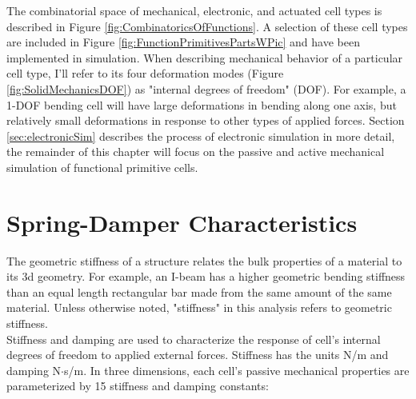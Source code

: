 { The combinatorial space of mechanical, electronic, and actuated cell types is described in Figure \ref{fig:CombinatoricsOfFunctions}.  A selection of these cell types are included in Figure \ref{fig:FunctionPrimitivesPartsWPic} and have been implemented in simulation.  When describing mechanical behavior of a particular cell type, I'll refer to its four deformation modes (Figure \ref{fig:SolidMechanicsDOF}) as "internal degrees of freedom" (DOF).  For example, a 1-DOF bending cell will have large deformations in bending along one axis, but relatively small deformations in response to other types of applied forces.  Section \ref{sec:electronicSim} describes the process of electronic simulation in more detail, the remainder of this chapter will focus on the passive and active mechanical simulation of functional primitive cells.

\section{Spring-Damper Characteristics}

The geometric stiffness of a structure relates the bulk properties of a material to its 3d geometry.  For example, an I-beam has a higher geometric bending stiffness than an equal length rectangular bar made from the same amount of the same material.  Unless otherwise noted, "stiffness" in this analysis refers to geometric stiffness.\\

Stiffness and damping are used to characterize the response of cell's internal degrees of freedom to applied external forces.  Stiffness has the units N/m and damping N$\cdot$s/m.  In three dimensions, each cell's passive mechanical properties are parameterized by 15 stiffness and damping constants:

}
